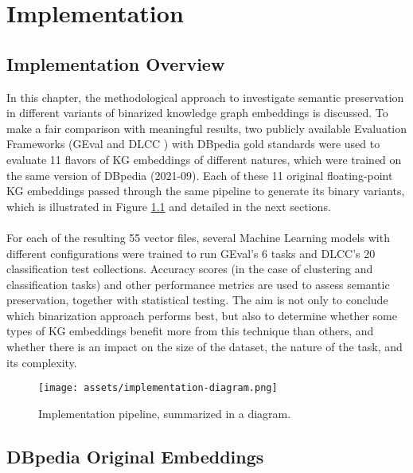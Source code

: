 \documentclass[11pt,titlepage,oneside,openany]{book}
\begin{document}
\chapter{Implementation}
\label{cha:impl}

\section{Implementation Overview}
\label{sec:impl-overview}

In this chapter, the methodological approach to investigate semantic preservation in different variants of binarized knowledge graph embeddings is discussed. To make a fair comparison with meaningful results, two publicly available Evaluation Frameworks (GEval \cite{pellegrino_geval_2020} and DLCC \cite{portisch_dlcc_2022}) with DBpedia gold standards were used to evaluate 11 flavors of KG embeddings of different natures, which were trained on the same version of DBpedia (2021-09). Each of these 11 original floating-point KG embeddings passed through the same pipeline to generate its binary variants, which is illustrated in Figure \ref{fig:implementation}  and detailed in the next sections.\\
\\
For each of the resulting 55 vector files, several Machine Learning models with different configurations were trained to run GEval's 6 tasks and DLCC's 20 classification test collections. Accuracy scores (in the case of clustering and classification tasks) and other performance metrics are used to assess semantic preservation, together with statistical testing. The aim is not only to conclude which binarization approach performs best, but also to determine whether some types of KG embeddings benefit more from this technique than others, and whether there is an impact on the size of the dataset, the nature of the task, and its complexity.
\begin{figure}[H]
    \centering
    \centerline{\texttt{[image: assets/implementation-diagram.png]}}
    \caption{Implementation pipeline, summarized in a diagram.}
    \label{fig:implementation}
\end{figure}

\section{DBpedia Original Embeddings}
\label{sec:emb-original}
\end{document}
